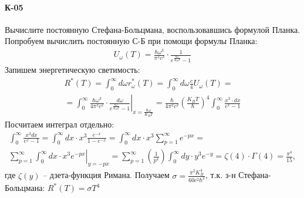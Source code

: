 \documentclass[__main__.tex]{subfiles}
\begin{document}
\paragraph{К-05}
Вычислите постоянную Стефана-Больцмана, воспользовавшись формулой Планка.\\

Попробуем вычислить постоянную С-Б при помощи формулы Планка:
    \begin{gather*}
    U_\omega(T)=\frac{\hbar\omega^3}{\pi^2c^3}\cdot\frac{1}{e^{\frac{\hbar\omega}{K_BT}}-1}
    \end{gather*}
    Запишем энергетическую светимость:
    \begin{gather*}
    R^\ast(T)
    =
    \int_{0}^{\infty}d\omega r^\ast_\omega(T)
    =
    \int_{0}^{\infty}d\omega\frac{c}{4}U_\omega(T)
    =\\
    =
    \left.
    \int_{0}^{\infty}\frac{\hbar\omega^3}{4\pi^2c^2}\cdot\frac{d\omega}{e^{\frac{\hbar\omega}{K_BT}}-1}
    \right|_{x=\frac{\hbar\omega}{K_BT}}
    =
    \frac{\hbar}{4\pi^2c^2}\left(\frac{K_BT}{\hbar}\right)^4\int_{0}^{\infty}\frac{x^3\cdot dx}{e^x-1}
    \end{gather*}
    Посчитаем интеграл отдельно:
    \begin{gather*}
    \int_{0}^{\infty}\frac{x^3dx}{e^x-1}
    =
    \int_{0}^{\infty}dx\cdot x^3\frac{e^{-x}}{1-e^{-x}}
    =
    \int_{0}^{\infty}dx\cdot x^3\sum_{p=1}^{\infty}e^{-px}
    =\\
    \left.
    \sum_{p=1}^{\infty}\int_{0}^{\infty}dx\cdot x^3e^{-px}
    \right|_{y=-px}
    =
    \sum_{p=1}^{\infty}\left(\frac{1}{p^4}\right)\int_{0}^{\infty}dy\cdot y^3e^{-y}
    =
    \zeta(4)\cdot\Gamma(4)
    =
    \frac{\pi^4}{15},
    \end{gather*}
    где $\zeta(y)$ -- дзета-функция Римана.
    Получаем $\sigma=\frac{\pi^2K_B^4}{60c^2\hbar^3}$, т.к. з-н Стефана-Больцмана: $R^\ast(T)=\sigma T^4$
\end{document}

